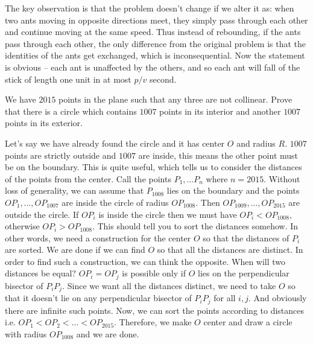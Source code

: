 \documentclass{subfile}
\begin{document}
		\begin{solution}
		    The key observation is that the problem doesn't change if we alter it as: when two ants moving in opposite directions meet, they simply pass through each other and continue moving at the same speed. Thus instead of rebounding, if the ants pass through each other, the only difference from the original problem is that the identities of the ants get exchanged, which is inconsequential. Now the statement is obvious – each ant is unaffected by the others, and so each ant will fall of the stick of length one unit in at most $p/v$ second.
		\end{solution}
		
		\begin{problem}
			We have $2015$ points in the plane such that any three are not collinear. Prove that there is a circle which contains $1007$ points in its interior and another $1007$ points in its exterior.
		\end{problem}
		
		\begin{solution}
			Let's say we have already found the circle and it has center $O$ and radius $R$. $1007$ points are strictly outside and $1007$ are inside, this means the other point must be on the boundary. This is quite useful, which tells us to consider the distances of the points from the center. Call the points $P_1,...P_{n}$ where $n=2015$. Without loss of generality, we can assume that $P_1008$ lies on the boundary and the points $OP_1,...,OP_{1007}$ are inside the circle of radius $OP_{1008}$. Then $OP_{1009},...,OP_{2015}$ are outside the circle. If $OP_i$ is inside the circle then we must have $OP_i<OP_{1008}$, otherwise $OP_i>OP_{1008}$. This should tell you to sort the distances somehow. In other words, we need a construction for the center $O$ so that the distances of $P_i$ are sorted. We are done if we can find $O$ so that all the distances are distinct. In order to find such a construction, we can think the opposite. When will two distances be equal? $OP_i=OP_j$ is possible only if $O$ lies on the perpendicular bisector of $P_iP_j$. Since we want all the distances distinct, we need to take $O$ so that it doesn't lie on any perpendicular bisector of $P_iP_j$ for all $i,j$. And obviously there are infinite such points. Now, we can sort the points according to distances i.e. $OP_1<OP_2<...<OP_{2015}$. Therefore, we make $O$ center and draw a circle with radius $OP_{1008}$ and we are done.
		\end{solution}
		
\end{document}

